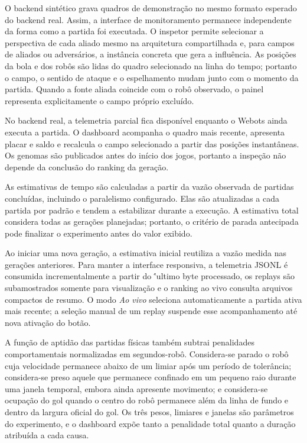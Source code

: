 \documentclass[12pt,a4paper]{article}
\begin{document}
O backend sint\'etico grava quadros de demonstra\c{c}\~ao no mesmo formato esperado do backend real. Assim, a interface de monitoramento permanece independente da forma como a partida foi executada. O inspetor permite selecionar a perspectiva de cada aliado mesmo na arquitetura compartilhada e, para campos de aliados ou advers\'arios, a inst\^ancia concreta que gera a influ\^encia. As posi\c{c}\~oes da bola e dos rob\^os s\~ao lidas do quadro selecionado na linha do tempo; portanto o campo, o sentido de ataque e o espelhamento mudam junto com o momento da partida. Quando a fonte aliada coincide com o rob\^o observado, o painel representa explicitamente o campo pr\'oprio exclu\'ido.

No backend real, a telemetria parcial fica dispon\'ivel enquanto o Webots ainda executa a partida. O dashboard acompanha o quadro mais recente, apresenta placar e saldo e recalcula o campo selecionado a partir das posi\c{c}\~oes instant\^aneas. Os genomas s\~ao publicados antes do in\'icio dos jogos, portanto a inspe\c{c}\~ao n\~ao depende da conclus\~ao do ranking da gera\c{c}\~ao.

As estimativas de tempo s\~ao calculadas a partir da vaz\~ao observada de partidas conclu\'idas, incluindo o paralelismo configurado. Elas s\~ao atualizadas a cada partida por padr\~ao e tendem a estabilizar durante a execu\c{c}\~ao. A estimativa total considera todas as gera\c{c}\~oes planejadas; portanto, o crit\'erio de parada antecipada pode finalizar o experimento antes do valor exibido.

Ao iniciar uma nova gera\c{c}\~ao, a estimativa inicial reutiliza a vaz\~ao medida nas gera\c{c}\~oes anteriores. Para manter a interface responsiva, a telemetria JSONL \'e consumida incrementalmente a partir do \''ultimo byte processado, os replays s\~ao subamostrados somente para visualiza\c{c}\~ao e o ranking ao vivo consulta arquivos compactos de resumo. O modo \emph{Ao vivo} seleciona automaticamente a partida ativa mais recente; a sele\c{c}\~ao manual de um replay suspende esse acompanhamento at\'e nova ativa\c{c}\~ao do bot\~ao.

A fun\c{c}\~ao de aptid\~ao das partidas f\'isicas tamb\'em subtrai penalidades comportamentais normalizadas em segundos-rob\^o. Considera-se parado o rob\^o cuja velocidade permanece abaixo de um limiar ap\'os um per\'iodo de toler\^ancia; considera-se preso aquele que permanece confinado em um pequeno raio durante uma janela temporal, embora ainda apresente movimento; e considera-se ocupa\c{c}\~ao do gol quando o centro do rob\^o permanece al\'em da linha de fundo e dentro da largura oficial do gol. Os tr\^es pesos, limiares e janelas s\~ao par\^ametros do experimento, e o dashboard exp\~oe tanto a penalidade total quanto a dura\c{c}\~ao atribu\'ida a cada causa.
\end{document}

